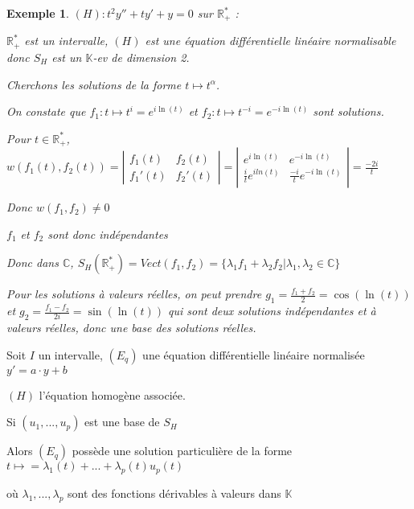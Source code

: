 \documentclass[a4paper,12pt]{book}
\newcommand{\Thr}[2]{\begin{tcolorbox}[sharp corners, colback=white,colframe=red!90!black!75, title=Théorème : #1]#2\end{tcolorbox}}
\newtheorem{Exe}{Exemple}[section]
\def\R{\mathbb{R}}
\def\C{\mathbb{C}}
\def\K{\mathbb{K}}
\begin{document}
\begin{Exe}
$(H) : t^2y'' + ty' + y = 0$ sur $\R_+^*$ :
\par $\R_+^*$ est un intervalle, $(H)$ est une équation différentielle linéaire normalisable donc $S_H$ est un $\K$-ev de dimension 2.
\par Cherchons les solutions de la forme $t\mapsto t^\alpha$.
\par On constate que $f_1:t\mapsto t^i = e^{i\ln(t)}$ et $f_2:t\mapsto t^{-i} = e^{-i\ln(t)}$ sont solutions.
\par Pour $t\in\R_+^*$, $w(f_1(t), f_2(t)) = \left\vert\begin{matrix}f_1(t) & f_2(t) \\  f_1'(t) & f_2'(t)\end{matrix}\right\vert = \left\vert\begin{matrix}e^{i\ln(t)} & e^{-i\ln(t)} \\ \frac{i}{t}e^{iln(t)} & \frac{-i}{t}e^{-i\ln(t)}\end{matrix}\right\vert = \frac{-2i}{t}$
\par Donc $w(f_1,f_2)\neq 0$
\par $f_1$ et $f_2$ sont donc indépendantes
\par Donc dans $\C$, $S_H(\R_+^*)=Vect(f_1, f_2) = \{\lambda_1f_1 + \lambda_2f_2 \vert \lambda_1,\lambda_2\in\C\}$
\par Pour les solutions à valeurs réelles, on peut prendre $g_1=\frac{f_1+f_2}{2} =\cos(\ln(t))$ et $g_2 =\frac{f_1-f_2}{2i}=\sin(\ln(t))$ qui sont deux solutions indépendantes et à valeurs réelles, donc une base des solutions réelles.
\end{Exe}
\Thr{Variation des constantes}{Soit $I$ un intervalle, $(E_q)$ une équation différentielle linéaire normalisée $y'=a\cdot y + b$
\par $(H)$ l'équation homogène associée.
\par Si $(u_1,...,u_p)$ est une base de $S_H$
\par Alors $(E_q)$ possède une solution particulière de la forme $t\mapsto =\lambda_1(t) +...+\lambda_p(t)u_p(t)$
\par où $\lambda_1,...,\lambda_p$ sont des fonctions dérivables à valeurs dans $\K$}
\end{document}
